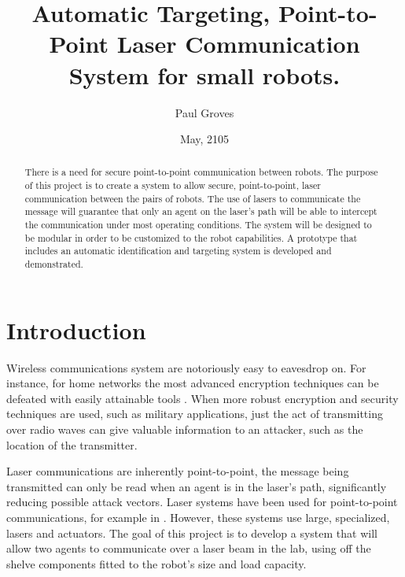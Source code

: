 \documentclass[botnum, fleqn]{unmeethesis}
\begin{document}
\frontmatter
\title{Automatic Targeting, Point-to-Point Laser Communication System for small robots.}
\author{Paul Groves}
\date{May, 2105}
\maketitle
\makecopyright
\maketitleabstract %

\begin{abstract}
There is a need for secure point-to-point communication between robots. The purpose of this project is to create a system to allow secure, point-to-point, laser communication between the pairs of robots. The use of lasers to communicate the message will guarantee that only an agent on the laser's path will be able to intercept the communication under most operating conditions. The system will be designed to be modular in order to be customized to the robot capabilities. A prototype that includes an automatic identification and targeting system is developed and demonstrated. 

\end{abstract}

\mainmatter
\section*{Introduction} \label{chp:introduction}
Wireless communications system are notoriously easy to eavesdrop on. For instance, for home networks the most advanced encryption techniques can be defeated with easily attainable tools \cite{wireless_vulnerabilities}.  When more robust encryption and security techniques are used, such as military applications, just the act of transmitting over radio waves can give valuable information to an attacker, such as the location of the transmitter\cite{wireless_triangulation}.

Laser communications are inherently point-to-point, the message being transmitted can only be read when an agent is in the laser's path, significantly reducing possible attack vectors. Laser systems have been used for point-to-point communications, for example in \cite{nasa_laser}\cite{transportable_laser}. However, these systems use large, specialized, lasers and actuators. The goal of this project is to develop a system that will allow two agents to communicate over a laser beam in the lab, using off the shelve components fitted to the robot's size and load capacity.
\end{document}
